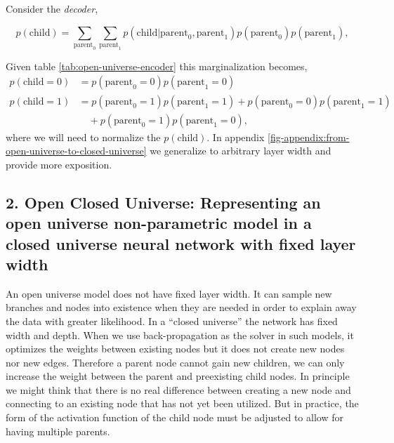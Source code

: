 \documentclass{article}
\begin{document}
Consider the \emph{decoder},

\begin{equation}
    p(\text{child}) = \sum_{\text{parent}_0} \sum_{\text{parent}_1} 
    p(\text{child}| \text{parent}_0, \text{parent}_1 ) p(\text{parent}_0)p(\text{parent}_1),
\end{equation}

Given table \ref{tab:open-universe-encoder} this marginalization becomes,
\begin{align}
    p(\text{child}=0) &= p(\text{parent}_0=0)p(\text{parent}_1=0) \\
    p(\text{child}=1) &= p(\text{parent}_0=1)p(\text{parent}_1=1) 
    +  p(\text{parent}_0=0)p(\text{parent}_1=1) \nonumber \\
    &\quad+ p(\text{parent}_0=1)p(\text{parent}_1=0),
\end{align}
where we will need to normalize the $p(\text{child})$.  In appendix \ref{fig-appendix:from-open-universe-to-closed-universe} we generalize to arbitrary layer width and provide more exposition.

\subsection{2. Open Closed Universe: Representing an open universe non-parametric model in a closed universe neural network with fixed layer width}\label{appendix:Open-Closed-Universe}

An open universe model does not have fixed layer width. It can sample new branches and nodes into existence when they are needed in order to explain away the data with greater likelihood.  In a ``closed universe'' the network has fixed width and depth.  When we use back-propagation as the solver in such models, it optimizes the weights between existing nodes but it does not create new nodes nor new edges.  Therefore a parent node cannot gain new children, we can only increase the weight between the parent and preexisting child nodes.  In principle we might think that there is no real difference between creating a new node and connecting to an existing node that has not yet been utilized.  But in practice, the form of the activation function of the child node must be adjusted to allow for having multiple parents.
\end{document}
